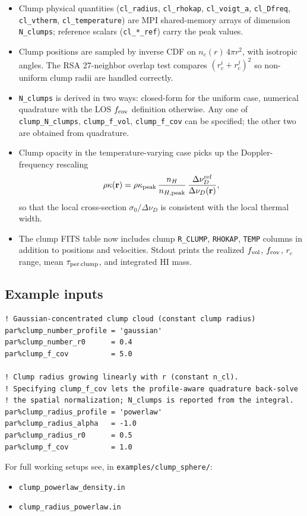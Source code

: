 \documentclass[english,a4paper]{my_memo}
\begin{document}
\begin{sloppypar}
\begin{itemize}
\item Clump physical quantities (\texttt{cl\_radius}, \texttt{cl\_rhokap},
      \texttt{cl\_voigt\_a}, \texttt{cl\_Dfreq}, \texttt{cl\_vtherm},
      \texttt{cl\_temperature}) are MPI shared-memory arrays of
      dimension \texttt{N\_clumps}; reference scalars
      (\texttt{cl\_*\_ref}) carry the peak values.
\item Clump positions are sampled by inverse CDF on
      $n_{c}(r)\,4\pi r^{2}$, with isotropic angles. The RSA
      27-neighbor overlap test compares
      $(r_{c}^{i}+r_{c}^{j})^{2}$ so non-uniform clump radii are
      handled correctly.
\item \texttt{N\_clumps} is derived in two ways: closed-form for the
      uniform case, numerical quadrature with the LOS $f_{\rm cov}$
      definition otherwise.  Any one of \texttt{clump\_N\_clumps},
      \texttt{clump\_f\_vol}, \texttt{clump\_f\_cov} can be specified;
      the other two are obtained from quadrature.
\item Clump opacity in the temperature-varying case picks up the
      Doppler-frequency rescaling
      \begin{equation}
        \rho\kappa(\mathbf{r}) = \rho\kappa_{\rm peak}\,
        \frac{n_H}{n_{H,{\rm peak}}}\,
        \frac{\Delta\nu_D^{\rm ref}}{\Delta\nu_D(\mathbf{r})},
      \end{equation}
      so that the local cross-section
      $\sigma_0/\Delta\nu_D$ is consistent with the local thermal
      width.
\item The clump FITS table now includes clump
      \texttt{R\_CLUMP}, \texttt{RHOKAP}, \texttt{TEMP} columns in
      addition to positions and velocities. Stdout prints the realized
      $f_{\rm vol}$, $f_{\rm cov}$, $r_{c}$ range, mean
      $\tau_{\rm per\,clump}$, and integrated HI mass.
\end{itemize}
\end{sloppypar}

\subsection{Example inputs}

\begin{lstlisting}
! Gaussian-concentrated clump cloud (constant clump radius)
par%clump_number_profile = 'gaussian'
par%clump_number_r0      = 0.4
par%clump_f_cov          = 5.0

! Clump radius growing linearly with r (constant n_cl).
! Specifying clump_f_cov lets the profile-aware quadrature back-solve
! the spatial normalization; N_clumps is reported from the integral.
par%clump_radius_profile = 'powerlaw'
par%clump_radius_alpha   = -1.0
par%clump_radius_r0      = 0.5
par%clump_f_cov          = 1.0
\end{lstlisting}
For full working setups see, in \texttt{examples/clump\_sphere/}:
\begin{itemize}
\item \texttt{clump\_powerlaw\_density.in}
\item \texttt{clump\_radius\_powerlaw.in}
\end{itemize}
\end{document}
